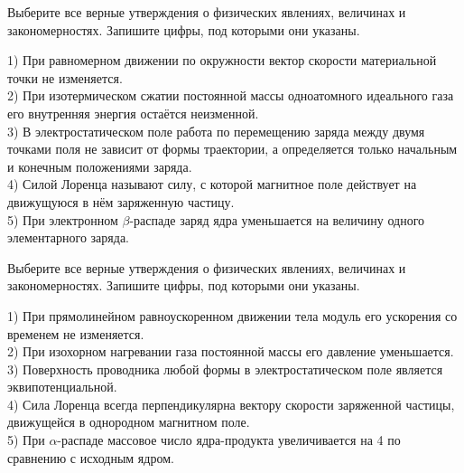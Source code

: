 \begin{taskbasic}[code={\label{task:kim18_v09}}]
Выберите все верные утверждения о физических явлениях, величинах и закономерностях. Запишите цифры, под которыми они указаны.

1) При равномерном движении по окружности вектор скорости материальной точки не изменяется.\\
2) При изотермическом сжатии постоянной массы одноатомного идеального газа его внутренняя энергия остаётся неизменной.\\
3) В электростатическом поле работа по перемещению заряда между двумя точками поля не зависит от формы траектории, а определяется только начальным и конечным положениями заряда.\\
4) Силой Лоренца называют силу, с которой магнитное поле действует на движущуюся в нём заряженную частицу.\\
5) При электронном $\beta$-распаде заряд ядра уменьшается на величину одного элементарного заряда.

\end{taskbasic}

\begin{taskbasic}[code={\label{task:kim18_v10}}]
Выберите все верные утверждения о физических явлениях, величинах и закономерностях. Запишите цифры, под которыми они указаны.

1) При прямолинейном равноускоренном движении тела модуль его ускорения со временем не изменяется.\\
2) При изохорном нагревании газа постоянной массы его давление уменьшается.\\
3) Поверхность проводника любой формы в электростатическом поле является эквипотенциальной.\\
4) Сила Лоренца всегда перпендикулярна вектору скорости заряженной частицы, движущейся в однородном магнитном поле.\\
5) При $\alpha$-распаде массовое число ядра-продукта увеличивается на 4 по сравнению с исходным ядром.

\end{taskbasic}


